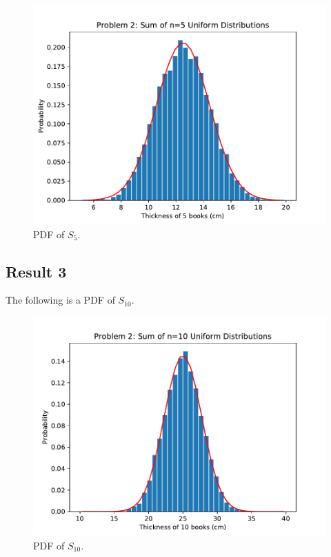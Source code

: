 \documentclass{article}
\begin{document}
\begin{figure}[H]
    \centering
    \includegraphics[width=\textwidth]{Images/Figure5}
    \caption{PDF of \(S_5\).}
    \label{P2:S5}
\end{figure}

\subsection{Result 3} The following is a PDF of \(S_{10}\).

\begin{figure}[H]
    \centering
    \includegraphics[width=\textwidth]{Images/Figure6}
    \caption{PDF of \(S_{10}\).}
    \label{P2:S10}
\end{figure}
\end{document}
